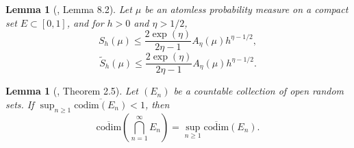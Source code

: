 \documentclass[11pt, reqno]{amsart}
\theoremstyle{plain}
\newtheorem{lemma}[theorem]{Lemma}
\theoremstyle{definition}
\theoremstyle{remark}
\begin{document}
\begin{lemma}[\cite{KS}, Lemma 8.2]\label{lm: KS Hilfslemma}
Let $\mu$ be an atomless probability measure on a compact set $E \subset [0,1]$, and for $h >0$ and $\eta > 1/2$,
$$ S_h(\mu) \leq \frac{2\exp(\eta)}{2\eta -1} A_{\eta}(\mu) h^{\eta - 1/2},$$
$$ \tilde{S}_h(\mu) \leq \frac{2\exp(\eta)}{2\eta -1} A_{\eta}(\mu) h^{\eta - 1/2}.$$
\end{lemma}

\begin{lemma}[\cite{KS}, Theorem 2.5]\label{lm: KS codimensionlemma}
Let $(E_n)$ be a countable collection of open random sets. If $\sup_{n\geq 1}\overline{\mathrm{codim}(E_n)}<1$, then
$$\overline{\mathrm{codim}}(\bigcap_{n=1}^\infty E_n)=\sup_{n\geq 1}\overline{\mathrm{codim}}(E_n).$$ 
\end{lemma}
\end{document}
